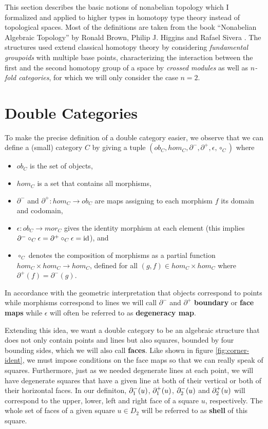 This section describes the basic notions of nonabelian topology which I
formalized and applied to higher types in homotopy type theory instead of topological
spaces. Most of the definitions are taken from the book ``Nonabelian
Algebraic Topology'' by Ronald Brown, Philip J. Higgins and Rafael Sivera
\cite{nat}.
The structures used extend classical homotopy theory by considering
\emph{fundamental groupoids} with multiple base points, characterizing the 
interaction between the first and the second homotopy group of a space by 
\emph{crossed modules} as well as \emph{$n$-fold categories}, for which we will
only consider the case $n = 2$.

\section{Double Categories}


To make the precise definition of a double category easier, we observe that we
can define a (small) category $C$ by giving a tuple $(ob_C, hom_C, \partial^-,
\partial^+, \epsilon, \circ_C)$ where
\begin{itemize}
\item $ob_C$ is the set of objects,
\item $hom_C$ is a set that contains all morphisms,
\item $\partial^-$ and $\partial^+ : hom_C \to ob_C$
are maps assigning to each morphism $f$ its domain and codomain,
\item $\epsilon : ob_C \to mor_C$ gives the identity morphism at each element
(this implies $\partial^- \circ_C \epsilon = \partial^+ \circ_C \epsilon = \operatorname{id}$), and
\item $\circ_C$
denotes the composition of morphisms as a partial function $hom_C \times hom_C
\to hom_C$, defined for all $(g, f) \in hom_C \times hom_C$ where
$\partial^+(f) = \partial^-(g)$.
\end{itemize}

In accordance with the geometric interpretation that objects correspond to points while
morphisms correspond to lines we will call $\partial^-$ and $\partial^+$
\textbf{boundary} or \textbf{face maps} while $\epsilon$ will often be referred
to as \textbf{degeneracy map}.

Extending this idea, we want a double category to be an algebraic structure
that does not only contain points and lines but also squares, bounded by four
bounding sides, which we will also call \textbf{faces}.
Like shown in figure \ref{fig:corner-ident}, we must impose conditions on the
face maps so that we can really speak of squares.
Furthermore, just as we needed degenerate lines at each point, we will have
degenerate squares that have a given line at both of their vertical or 
both of their horizontal faces.
In our definiton, $\partial^-_1(u)$, $\partial^+_1(u)$, $\partial^-_2(u)$ and $\partial^+_2(u)$
will correspond to the upper, lower, left and right face of a square $u$, respectively.
The whole set of faces of a given square $u \in D_2$ will be referred to as
\textbf{shell} of this square.

